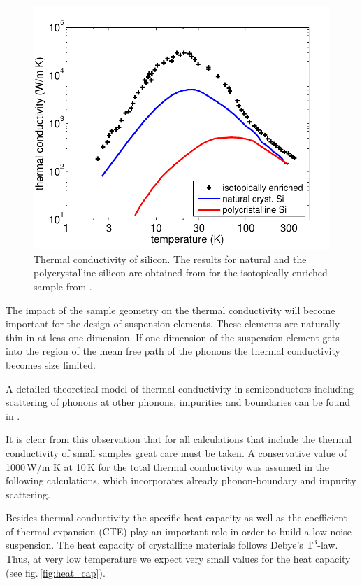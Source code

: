 \begin{figure}[!h]
\begin{center}
\includegraphics[scale=0.7]{./Sec_Suspensions/Figures/Si_TC_isotope.pdf}
\end{center}
\caption{Thermal conductivity of silicon. The results for natural and the polycrystalline silicon are obtained from \cite{Touloukian1970_kappa_metal} for the isotopically enriched sample from \cite{Ruf2000}.}
\label{fig:Si_isotope}
\end{figure}

The impact of the sample geometry on the thermal conductivity will become important for the design of suspension elements. These elements are naturally thin in at leas one dimension. If one dimension of the suspension element gets into the region of the mean free path of the phonons the thermal conductivity becomes size limited. 

A detailed theoretical model of thermal conductivity in semiconductors including scattering of phonons at other phonons, impurities and boundaries can be found in \cite{Morelli2002}.

It is clear from this observation that for all calculations that include the thermal conductivity of small samples great care must be taken. A conservative value of 1000\,W/m K at 10\,K  for the total thermal conductivity was assumed   in the following calculations, which  incorporates already phonon-boundary and impurity scattering.

Besides thermal conductivity the specific heat capacity as well as the coefficient of thermal expansion (CTE) play an important role in order to build a low noise suspension. The heat capacity of crystalline materials follows Debye's $\mathrm{T^3}$-law. Thus, at very low temperature we expect very small values for the heat capacity (see fig.\,\ref{fig:heat_cap}).

